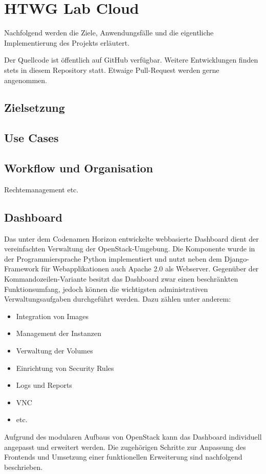 \chapter{HTWG Lab Cloud}

Nachfolgend werden die Ziele, Anwendungsfälle und die eigentliche Implementierung des Projekts erläutert.

Der Quellcode ist öffentlich auf GitHub \cite{git-source} verfügbar. Weitere Entwicklungen finden stets in diesem Repository statt. Etwaige Pull-Request werden gerne angenommen.

\section{Zielsetzung}

\section{Use Cases}

\section{Workflow und Organisation}

Rechtemanagement etc.

\section{Dashboard}

Das unter dem Codenamen Horizon entwickelte webbasierte Dashboard dient der vereinfachten Verwaltung der OpenStack-Umgebung. Die Komponente wurde in der Programmiersprache Python implementiert und nutzt neben dem Django-Framework für Webapplikationen auch Apache 2.0 als Webserver. Gegenüber der Kommandozeilen-Variante besitzt das Dashboard zwar einen beschränkten Funktionsumfang, jedoch können die wichtigsten administrativen Verwaltungsaufgaben durchgeführt werden. Dazu zählen unter anderem:
\begin{itemize}
\item Integration von Images
\item Management der Instanzen
\item Verwaltung der Volumes
\item Einrichtung von Security Rules
\item Logs und Reports
\item VNC
\item etc.
\end{itemize}
Aufgrund des modularen Aufbaus von OpenStack kann das Dashboard individuell angepasst und erweitert werden. Die zugehörigen Schritte zur Anpassung des Frontends und Umsetzung einer funktionellen Erweiterung sind nachfolgend beschrieben.

